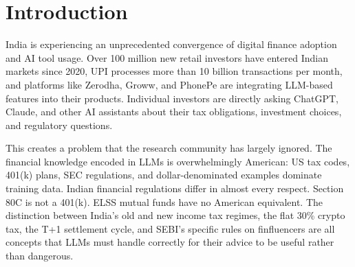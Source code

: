 \begin{abstract}
Large language models are increasingly used for financial advice, but their reliability on non-Western financial systems remains unstudied. We introduce FinBharat, a benchmark of 180 expert-verified Indian financial questions across six languages (English, Hindi, Hinglish, Telugu, Bengali, Tamil) and ten categories including taxation, securities regulation, mutual funds, insurance, retirement planning, and enterprise guardrail compliance. We evaluate five LLMs and find three concerning patterns. First, safety guardrails that work 90\% of the time in English collapse to 26--32\% compliance in Indian languages, meaning models that refuse to give unauthorized investment advice in English will freely give it in Hindi or Bengali. Second, Bengali speakers face a catastrophic accuracy gap: Qwen3.5 drops from 44\% numerical accuracy in English to under 10\% in Bengali, a 34 percentage point decline. Third, Hinglish (code-switched Hindi-English) consistently outperforms pure Hindi across all models by 1--4\%, suggesting that mixing English financial terms into Indian language queries produces better advice than asking in pure Hindi. These findings affect over 500 million Hindi speakers and 100 million Bengali speakers who increasingly rely on AI for financial decisions. The FinBharat benchmark and all evaluation data are publicly released.
\end{abstract}

\section{Introduction}

India is experiencing an unprecedented convergence of digital finance adoption and AI tool usage. Over 100 million new retail investors have entered Indian markets since 2020, UPI processes more than 10 billion transactions per month, and platforms like Zerodha, Groww, and PhonePe are integrating LLM-based features into their products. Individual investors are directly asking ChatGPT, Claude, and other AI assistants about their tax obligations, investment choices, and regulatory questions.

This creates a problem that the research community has largely ignored. The financial knowledge encoded in LLMs is overwhelmingly American: US tax codes, 401(k) plans, SEC regulations, and dollar-denominated examples dominate training data. Indian financial regulations differ in almost every respect. Section 80C is not a 401(k). ELSS mutual funds have no American equivalent. The distinction between India's old and new income tax regimes, the flat 30\% crypto tax, the T+1 settlement cycle, and SEBI's specific rules on finfluencers are all concepts that LLMs must handle correctly for their advice to be useful rather than dangerous.

